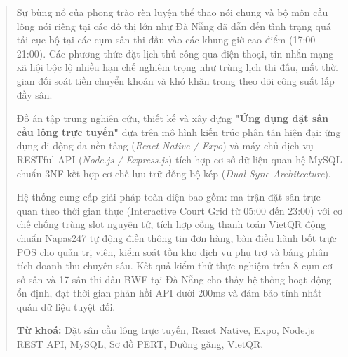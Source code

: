 \begin{abstract}

Sự bùng nổ của phong trào rèn luyện thể thao nói chung và bộ môn cầu lông nói riêng tại các đô thị lớn như Đà Nẵng đã dẫn đến tình trạng quá tải cục bộ tại các cụm sân thi đấu vào các khung giờ cao điểm (17:00 -- 21:00). Các phương thức đặt lịch thủ công qua điện thoại, tin nhắn mạng xã hội bộc lộ nhiều hạn chế nghiêm trọng như trùng lịch thi đấu, mất thời gian đối soát tiền chuyển khoản và khó khăn trong theo dõi công suất lấp đầy sân. 

Đồ án tập trung nghiên cứu, thiết kế và xây dựng \textbf{"Ứng dụng đặt sân cầu lông trực tuyến"} dựa trên mô hình kiến trúc phân tán hiện đại: ứng dụng di động đa nền tảng (\textit{React Native / Expo}) và máy chủ dịch vụ RESTful API (\textit{Node.js / Express.js}) tích hợp cơ sở dữ liệu quan hệ MySQL chuẩn 3NF kết hợp cơ chế lưu trữ đồng bộ kép (\textit{Dual-Sync Architecture}). 

Hệ thống cung cấp giải pháp toàn diện bao gồm: ma trận đặt sân trực quan theo thời gian thực (Interactive Court Grid từ 05:00 đến 23:00) với cơ chế chống trùng slot nguyên tử, tích hợp cổng thanh toán VietQR động chuẩn Napas247 tự động điền thông tin đơn hàng, bàn điều hành bốt trực POS cho quản trị viên, kiểm soát tồn kho dịch vụ phụ trợ và bảng phân tích doanh thu chuyên sâu. Kết quả kiểm thử thực nghiệm trên 8 cụm cơ sở sân và 17 sân thi đấu BWF tại Đà Nẵng cho thấy hệ thống hoạt động ổn định, đạt thời gian phản hồi API dưới 200ms và đảm bảo tính nhất quán dữ liệu tuyệt đối.

\vspace{0.8em}
\noindent\textbf{Từ khoá:} Đặt sân cầu lông trực tuyến, React Native, Expo, Node.js REST API, MySQL, Sơ đồ PERT, Đường găng, VietQR.

\end{abstract}
